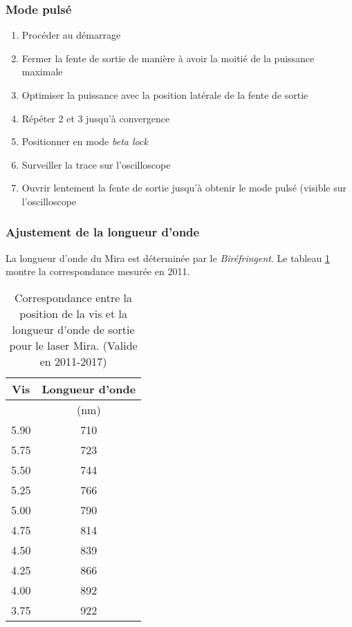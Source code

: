 \documentclass[11pt,francais]{book} %
\begin{document}
\subsubsection{Mode pulsé}
\begin{enumerate}
\item Procéder au démarrage
\item Fermer la fente de sortie de manière à avoir la moitié de la puissance maximale
\item Optimiser la puissance avec la position latérale de la fente de sortie
\item Répéter 2 et 3 jusqu'à convergence
\item Positionner en mode {\it beta lock}
\item Surveiller la trace sur l'oscilloscope
\item Ouvrir lentement la fente de sortie jusqu'à obtenir le mode pulsé (visible sur l'oscilloscope
\end{enumerate}


\subsubsection{Ajustement de la longueur d'onde}

La longueur d'onde du Mira est déterminée par le {\it Biréfringent}.
Le tableau \ref{table:positionVisMira} montre la correspondance mesurée en 2011.

\begin{table}[htbp]
  \caption{Correspondance entre la position de la vis et la longueur d'onde de sortie pour le laser Mira. (Valide en 2011-2017)}
  \label{table:positionVisMira}
  \centering
    \begin{tabular}{cc}
    Vis & Longueur d'onde  \\ \hline
    ~      & (nm)       \\
    5.90      & 710     \\
    5.75      & 723     \\
    5.50      & 744     \\
    5.25      & 766     \\
    5.00      & 790     \\
    4.75      & 814     \\
    4.50      & 839     \\
    4.25      & 866     \\
    4.00      & 892     \\
    3.75      & 922     \\
    \end{tabular}
\end{table}
\end{document}
